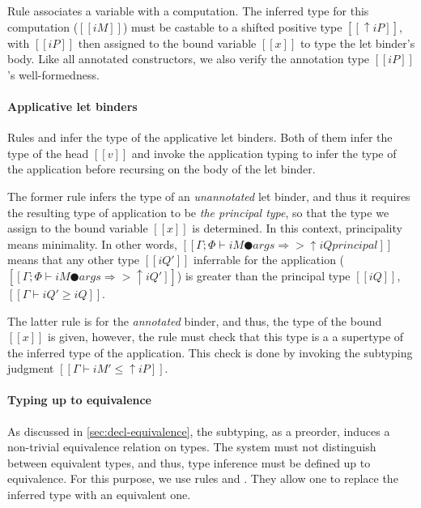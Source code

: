   Rule  associates a variable with a computation.
  The inferred type for this computation ($[[iM]]$) must be castable to a
  shifted positive type $[[↑iP]]$, with $[[iP]]$ then assigned to the bound
  variable $[[x]]$ to type the let binder's body. Like all annotated
  constructors, we also verify the annotation type $[[iP]]$'s well-formedness. 
  
\paragraph{Applicative let binders}
  Rules  and 
  infer the type of the applicative let binders.
  Both of them infer the type of the head $[[v]]$ 
  and invoke the application typing to infer the type of the application 
  before recursing on the body of the let binder.

  The former rule infers the type of an \emph{unannotated} let binder, and thus
  it requires the resulting type of application to be \emph{the principal type},
  so that the type we assign to the bound variable $[[x]]$ is determined.
  In this context, principality means minimality. In other words, 
  $[[Γ ; Φ ⊢ iM ● args ⇒> ↑iQ principal]]$ means that
  any other type $[[iQ']]$ inferrable for the application (\ie $[[Γ ; Φ ⊢ iM ● args ⇒> ↑iQ']]$)
  is greater than the principal type $[[iQ]]$, \ie $[[Γ ⊢ iQ' ≥ iQ]]$.

  The latter rule is for the \emph{annotated} binder,
  and thus, the type of the bound $[[x]]$ is given, 
  however, the rule must check that this type is a
  a supertype of the inferred type of the application. 
  This check is done by invoking the subtyping judgment
  $[[Γ ⊢ iM' ≤ ↑iP]]$.

\paragraph{Typing up to equivalence}
  As discussed in \cref{sec:decl-equivalence}, the subtyping, as a preorder, 
  induces a non-trivial equivalence relation on types. 
  The system must not distinguish between equivalent types,
  and thus, type inference must be defined up to equivalence. 
  For this purpose, we use rules   
  and .
  They allow one to replace the inferred type with an equivalent one.  

